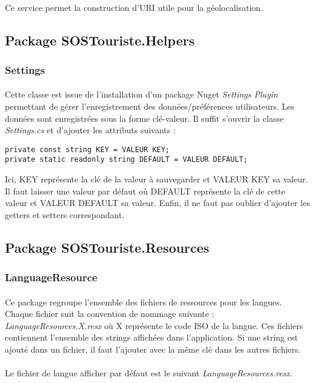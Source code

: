 		\paragraph{}
			Ce service permet la construction d'URI utile pour la géolocalisation.

\subsection{Package SOSTouriste.Helpers}
	\subsubsection{Settings}
		\paragraph{}
			Cette classe est issue de l'installation d'un package Nuget \emph{Settings Plugin} permettant de gérer l'enregistrement des données/préférences utilisateurs. Les données sont enregistrées sous la forme clé-valeur. Il suffit s'ouvrir la classe \emph{Settings.cs} et d'ajouter les attributs suivants :
\lstset{style=sharpc}
\begin{lstlisting}
private const string KEY = VALEUR KEY;
private static readonly string DEFAULT = VALEUR DEFAULT;
\end{lstlisting}
		Ici, KEY représente la clé de la valeur à sauvegarder et VALEUR KEY sa valeur. Il faut laisser une valeur par défaut où DEFAULT représente la clé de cette valeur et VALEUR DEFAULT sa valeur. Enfin, il ne faut pas oublier d'ajouter les getters et setters correspondant.

\subsection{Package SOSTouriste.Resources}
	\subsubsection{LanguageResource}
		\paragraph{}
			Ce package regroupe l'ensemble des fichiers de ressources pour les langues. Chaque fichier suit la convention de nommage suivante : \emph{LanguageResources.X.resx} où X représente le code ISO de la langue. Ces fichiers contiennent l'ensemble des strings affichées dans l'application. Si une string est ajouté dans un fichier, il faut l'ajouter avec la même clé dans les autres fichiers.
			
		\paragraph{}
			Le fichier de langue afficher par défaut est le suivant \emph{LanguageResources.resx}.